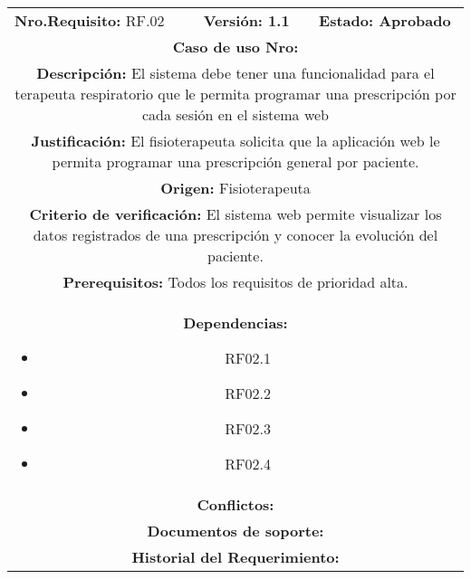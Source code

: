 \begin{center}
        
        \medskip
        
        
        
        
        \begin{tabular}{|c|c|p{4cm}|p{4cm}|}
            \hline
            \rowcolor{red} \multicolumn{4}{|c|}{\textbf{Prioridad:} Alta}  \\
            \hline
            \multicolumn{2}{|l}{\textbf{Nro.Requisito: }RF.02} & \multicolumn{1}{|l}{\textbf{Versión: 1.1}} & \multicolumn{1}{|l|}{\textbf{Estado: Aprobado}} \\
            \multicolumn{4}{|p{13cm}|}{\textbf{Caso de uso Nro: }}  \\
            \hline
            \multicolumn{4}{|p{13cm}|}{\textbf{Descripción: } El sistema debe tener una funcionalidad para el terapeuta respiratorio que le permita programar una prescripción por cada sesión en el sistema web } \\
            \multicolumn{4}{|p{13cm}|}{\textbf{Justificación: } El fisioterapeuta solicita que la aplicación web le permita programar una prescripción general por paciente.} \\ 
            \multicolumn{4}{|p{13cm}|}{\textbf{Origen: }Fisioterapeuta}  \\
            \multicolumn{4}{|p{13cm}|}{\textbf{Criterio de verificación: } El sistema web permite visualizar los datos registrados de una prescripción y conocer la evolución del paciente.  } \\
            \hline
            \multicolumn{4}{|p{13cm}|}{\textbf{Prerequisitos: } Todos los requisitos de prioridad alta. }\\
            \hline \multicolumn{4}{|p{12cm}|}{\textbf{Dependencias: }
                \begin{itemize}
                \item RF02.1
                \item RF02.2
                \item RF02.3
                \item RF02.4
                \end{itemize}}  \\
            \multicolumn{4}{|p{12cm}|}{\textbf{Conflictos: }}  \\
            \hline
            \multicolumn{4}{|p{12cm}|}{\textbf{Documentos de soporte: }}  \\
            \hline
            \multicolumn{4}{|p{12cm}|}{\textbf{Historial del Requerimiento: }}  \\

\end{tabular}
\end{center}
